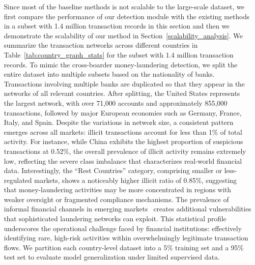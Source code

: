 Since most of the baseline methods is not scalable to the large-scale dataset, we first compare the performance of our detection module with the existing methods in a subset with 1.4 million transaction records in this section and then we demonstrate the scalability of our method in Section~\ref{scalability_analysis}. We summarize the transaction networks across different countries in Table~\ref{tab:country_graph_stats} for the subset with 1.4 million transaction records. To mimic the cross-boarder money-laundering detection, we split the entire dataset into multiple subsets based on the nationality of banks. Transactions involving multiple banks are duplicated so that they appear in the networks of all relevant countries. After splitting, the United States represents the largest network, with over 71,000 accounts and approximately 855,000 transactions, followed by major European economies such as Germany, France, Italy, and Spain. Despite the variations in network size, a consistent pattern emerges across all markets: illicit transactions account for less than 1\% of total activity. For instance, while China exhibits the highest proportion of suspicious transactions at 0.52\%, the overall prevalence of illicit activity remains extremely low, reflecting the severe class imbalance that characterizes real-world financial data. Interestingly, the “Rest Countries” category, comprising smaller or less-regulated markets, shows a noticeably higher illicit ratio of 0.85\%, suggesting that money-laundering activities may be more concentrated in regions with weaker oversight or fragmented compliance mechanisms. The prevalence of informal financial channels in emerging markets~\parencite{bao2018nisingh} creates additional vulnerabilities that sophisticated laundering networks can exploit. This statistical profile underscores the operational challenge faced by financial institutions: effectively identifying rare, high-risk activities within overwhelmingly legitimate transaction flows. We partition each country-level dataset into a 5\% training set and a 95\% test set to evaluate model generalization under limited supervised data. 

